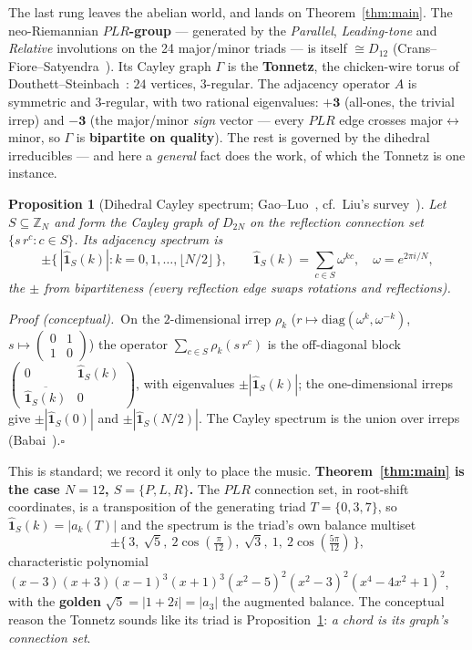 \documentclass[11pt]{article}
\newtheorem{proposition}{Proposition}
\newcommand{\Zn}[1]{\mathbb{Z}_{#1}}
\begin{document}
The last rung leaves the abelian world, and lands on Theorem~\ref{thm:main}. The neo-Riemannian
\textbf{$PLR$-group} --- generated by the
\emph{Parallel}, \emph{Leading-tone} and \emph{Relative} involutions on the 24 major/minor triads --- is
itself $\cong D_{12}$ (Crans--Fiore--Satyendra~\cite{CFS}). Its Cayley graph $\Gamma$ is the \textbf{Tonnetz},
the chicken-wire torus of Douthett--Steinbach~\cite{DS}: $24$ vertices, $3$-regular. The adjacency operator
$A$ is symmetric and $3$-regular, with two rational eigenvalues: $\mathbf{+3}$ (all-ones, the trivial irrep)
and $\mathbf{-3}$ (the major/minor \emph{sign} vector --- every $PLR$ edge crosses major$\leftrightarrow$minor,
so $\Gamma$ is \textbf{bipartite on quality}). The rest is governed by the dihedral irreducibles --- and here a \emph{general} fact does the work, of which
the Tonnetz is one instance.

\begin{proposition}[Dihedral Cayley spectrum; Gao--Luo~\cite{GaoLuo}, cf.\ Liu's survey~\cite{LiuSurvey}]\label{prop:dihedral}
Let $S\subseteq\Zn{N}$ and form the Cayley graph of $D_{2N}$ on the \emph{reflection} connection set
$\{s\,r^{c}:c\in S\}$. Its adjacency spectrum is
\[
  \pm\bigl\{\,|\hat{\mathbf 1}_S(k)|:k=0,1,\dots,\lfloor N/2\rfloor\,\bigr\},\qquad
  \hat{\mathbf 1}_S(k)=\sum_{c\in S}\omega^{kc},\quad \omega=e^{2\pi i/N},
\]
the $\pm$ from bipartiteness (every reflection edge swaps rotations and reflections).
\end{proposition}
\noindent\textit{Proof (conceptual).}~On the $2$-dimensional irrep $\rho_k$
($r\mapsto\mathrm{diag}(\omega^{k},\omega^{-k})$, $s\mapsto\left(\begin{smallmatrix}0&1\\1&0\end{smallmatrix}\right)$)
the operator $\sum_{c\in S}\rho_k(s\,r^{c})$ is the off-diagonal block
$\left(\begin{smallmatrix}0&\hat{\mathbf 1}_S(k)\\[1pt]\overline{\hat{\mathbf 1}_S(k)}&0\end{smallmatrix}\right)$,
with eigenvalues $\pm|\hat{\mathbf 1}_S(k)|$; the one-dimensional irreps give $\pm|\hat{\mathbf 1}_S(0)|$ and
$\pm|\hat{\mathbf 1}_S(N/2)|$. The Cayley spectrum is the union over irreps (Babai~\cite{Babai}).\hfill$\square$

\smallskip\noindent This is standard; we record it only to place the music. \textbf{Theorem~\ref{thm:main} is
the case $N=12$, $S=\{P,L,R\}$.} The $PLR$ connection set, in root-shift coordinates, is a transposition of
the generating triad $T=\{0,3,7\}$, so $\hat{\mathbf 1}_S(k)=|a_k(T)|$ and the spectrum is the triad's own
balance multiset
\[
  \pm\{\,3,\ \sqrt5,\ 2\cos(\tfrac{\pi}{12}),\ \sqrt3,\ 1,\ 2\cos(\tfrac{5\pi}{12})\,\},
\]
characteristic polynomial $(x-3)(x+3)(x-1)^3(x+1)^3(x^2-5)^2(x^2-3)^2(x^4-4x^2+1)^2$, with the \textbf{golden}
$\sqrt5=|1+2i|=|a_3|$ the augmented balance. The conceptual reason the Tonnetz sounds like its triad is
Proposition~\ref{prop:dihedral}: \emph{a chord is its graph's connection set}.
\end{document}

